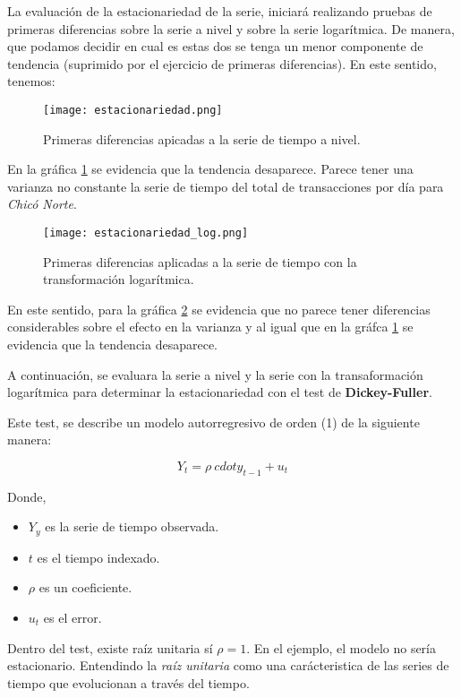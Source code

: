 \documentclass[a4paper]{article}
\begin{document}
La evaluación de la estacionariedad de la serie, iniciará realizando pruebas de primeras diferencias sobre la serie a nivel y sobre la serie logarítmica. De manera, que podamos decidir en cual es estas dos se tenga un menor componente de tendencia (suprimido por el ejercicio de primeras diferencias). En este sentido, tenemos:

\begin{figure}[h]
    \centering
	\texttt{[image: estacionariedad.png]}
    \caption{Primeras diferencias apicadas a la serie de tiempo a nivel.}
    \label{fig:estacionariedad}
\end{figure}

En la gráfica \ref{fig:estacionariedad} se evidencia que la tendencia desaparece. Parece tener una varianza no constante la serie de tiempo del total de transacciones por día para \textit{Chicó Norte}.

\begin{figure}[h]
    \centering
	\texttt{[image: estacionariedad\_log.png]}
    \caption{Primeras diferencias aplicadas a la serie de tiempo con la transformación logarítmica.}
    \label{fig:estacionariedad_log}
\end{figure}

En este sentido, para la gráfica \ref{fig:estacionariedad_log} se evidencia que no parece tener diferencias considerables sobre el efecto en la varianza y al igual que en la gráfca \ref{fig:estacionariedad} se evidencia que la tendencia desaparece.

A continuación, se evaluara la serie a nivel y la serie con la transaformación logarítmica para determinar la estacionariedad con el test de \textbf{Dickey-Fuller}.

Este test, se describe un modelo autorregresivo de orden (1) de la siguiente manera:

\begin{equation}
Y_t = \rho \ cdot y_{t-1} + u_t
\end{equation}

Donde,

\begin{itemize}
	\item $Y_y$ es la serie de tiempo observada.
	\item $t$ es el tiempo indexado.
	\item $\rho$ es un coeficiente.
	\item $u_t$ es el error.
\end{itemize}

Dentro del test, existe raíz unitaria sí $\rho = 1$. En el ejemplo, el modelo no sería estacionario. Entendindo la \textit{raíz unitaria} como una carácteristica de las series de tiempo que evolucionan a través del tiempo.
\end{document}
